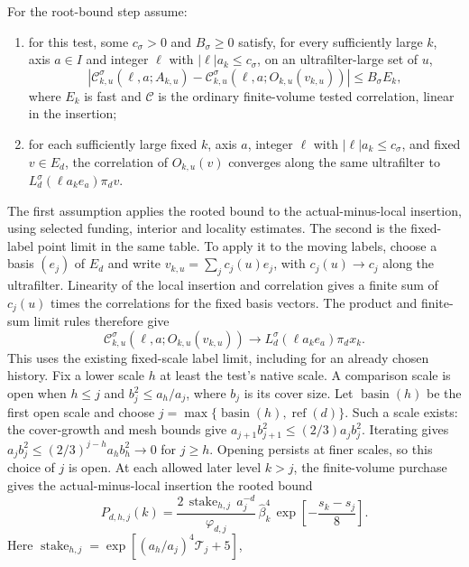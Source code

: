 For the root-bound step assume:
\begin{enumerate}
\item for this test, some $c_\sigma>0$ and $B_\sigma\ge0$ satisfy, for
 every sufficiently large $k$, axis $a\in I$ and integer $\ell$ with
 $|\ell|a_k\le c_\sigma$, on an ultrafilter-large set of $u$,
\[
 |\mathcal C^{\sigma}_{k,u}(\ell,a;A_{k,u})-
   \mathcal C^{\sigma}_{k,u}(\ell,a;O_{k,u}(v_{k,u}))|
 \le B_\sigma E_k,
\]
 where $E_k$ is fast and $\mathcal C$ is the ordinary finite-volume
 tested correlation, linear in the insertion;
\item for each sufficiently large fixed $k$, axis $a$, integer $\ell$ with
 $|\ell|a_k\le c_\sigma$, and fixed $v\in E_d$, the correlation of
 $O_{k,u}(v)$ converges along the same ultrafilter to
 $L^{\sigma}_d(\ell a_ke_a)\pi_d v$.
\end{enumerate}
The first assumption applies the rooted bound to the actual-minus-local
insertion, using selected funding, interior and locality estimates. The
second is the fixed-label point limit in the same table. To apply it to the moving labels,
choose a basis $(e_j)$ of $E_d$ and write
$v_{k,u}=\sum_j c_j(u)e_j$, with $c_j(u)\to c_j$ along the ultrafilter.
Linearity of the local insertion and correlation gives a finite sum of
$c_j(u)$ times the correlations for the fixed basis vectors. The product
and finite-sum limit rules therefore give
\[
 \mathcal C^{\sigma}_{k,u}(\ell,a;O_{k,u}(v_{k,u}))
 \longrightarrow L^{\sigma}_d(\ell a_ke_a)\pi_d x_k.
\]
This uses the existing fixed-scale label limit, including for an already
chosen history. Fix a lower scale $h$ at least the test's native scale. A comparison scale is open when $h\le j$ and $b_j^2\le a_h/a_j$, where $b_j$
is its cover size. Let $\operatorname{basin}(h)$ be the first open scale and
choose $j=\max\{\operatorname{basin}(h),\operatorname{ref}(d)\}$. Such a scale exists: the cover-growth and mesh bounds give
$a_{j+1}b_{j+1}^2\le(2/3)a_jb_j^2$. Iterating gives
$a_jb_j^2\le(2/3)^{j-h}a_hb_h^2\to0$ for $j\ge h$. Opening persists at
finer scales, so this choice of $j$ is open. At each allowed later level $k>j$, the
finite-volume purchase gives the actual-minus-local insertion the rooted bound
\begin{equation}
 P_{d,h,j}(k)=
 \frac{2\,\operatorname{stake}_{h,j}\,a_j^{-d}}
      {\varphi_{d,j}}\,
 \widehat\beta_k^4\,
 \exp\!\left[-\frac{s_k-s_j}{8}\right].
 \label{eq:ex-branch-native-root-price}
\end{equation}
Here $\operatorname{stake}_{h,j}=\exp[(a_h/a_j)^4\mathcal T_j+5]$,

